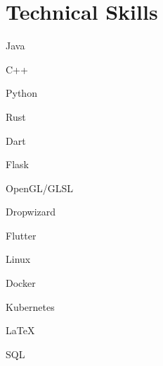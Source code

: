 \documentclass[hidelinks]{scrartcl}
\begin{document}
\section{Technical Skills}
{
    \item[] Java 
    \item C++ 
    \item Python 
    \item Rust
    \item Dart
}

{
    \item[] Flask
    \item OpenGL/GLSL
    \item Dropwizard
    \item Flutter
}

{
    \item[] Linux
    \item Docker
    \item Kubernetes
    \item \LaTeX
    \item SQL
}

\vfill
{\color{mycolor}\titlerule}
\end{document}
